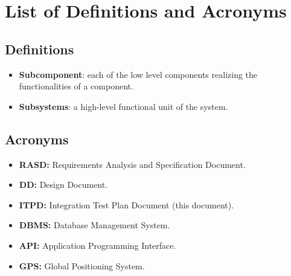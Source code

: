 \section{List of Definitions and Acronyms}
\subsection{Definitions}
\begin{itemize}
\item \textbf{Subcomponent}: each of the low level components realizing the functionalities of a component. 
\item \textbf{Subsystems}: a high-level functional unit of the system.
\end{itemize}
\subsection{Acronyms}
\begin{itemize}
\item \textbf{RASD:} Requirements Analysis and Specification Document.
\item \textbf{DD:} Design Document.
\item \textbf{ITPD:} Integration Test Plan Document (this document).
\item \textbf{DBMS:} Database Management System.
\item \textbf{API:} Application Programming Interface.
\item \textbf{GPS:} Global Positioning System.
\end{itemize}

